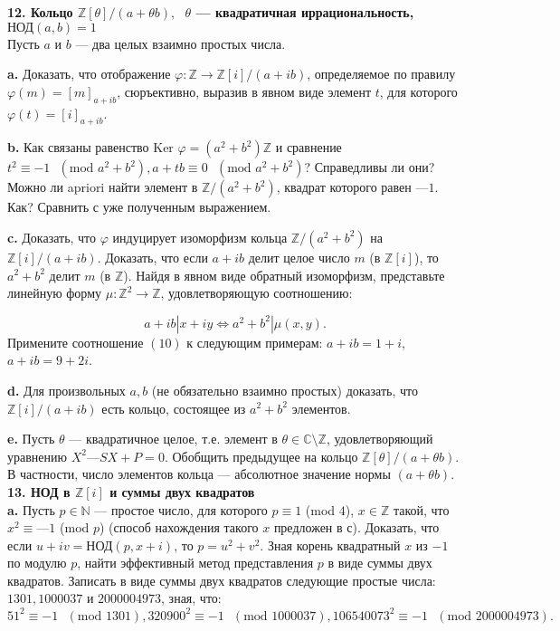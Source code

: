 \noindent \textbf{12. Кольцо $\mathbb{Z}[\theta] / (a + \theta b), \text{ } \theta$ — квадратичная иррациональность,} \\ $\text{НОД}(a,b) = 1$
\\

Пусть $a$ и $b$ — два целых взаимно простых числа.

\textbf{a.} Доказать, что отображение $\varphi:\mathbb{Z}\to\mathbb{Z}[i]/(a+ib)$, определяемое по правилу $\varphi(m)=[m]_{a+ib}$, сюръективно, выразив в явном виде элемент $t$, для которого $\varphi(t)=[i]_{a+ib}$.

\textbf{b.} Как связаны равенство $\text{Ker }\varphi=(a^2+b^2)\mathbb{Z}$ и сравнение $t^2\equiv-1 \text{ } (\text{mod } a^2+b^2), a+tb\equiv0 \text{ } (\text{mod } a^2+b^2)$? Справедливы ли они? Можно ли
apriori найти элемент в $\mathbb{Z}/(a^2 + b^2)$, квадрат которого равен $—1$. Как? Сравнить с уже полученным выражением.

\textbf{c.} Доказать, что $\varphi$ индуцирует изоморфизм кольца $\mathbb{Z}/(a^2 + b^2)$ на $\mathbb{Z}[i]/(a+ib)$. Доказать, что если $a + ib$ делит целое число $m$ (в $\mathbb{Z}[i]$), то $a^2 + b^2$ делит $m$ (в $\mathbb{Z}$). Найдя в явном виде обратный изоморфизм, представьте линейную форму $\mu:\mathbb{Z}^2\to\mathbb{Z}$, удовлетворяющую соотношению:

\[
a+ib|x+iy\Longleftrightarrow a^2+b^2|\mu(x,y).
\]
Примените соотношение $(10)$ к следующим примерам: $a + ib = 1 + i$,
$a + ib = 9 + 2i$.

\pagebreak

\textbf{d.} Для произвольных $a, b$ (не обязательно взаимно простых) 
доказать, что $\mathbb{Z}[i]/(a+ib)$ есть кольцо, состоящее из $a^2 + b^2$ элементов.

\textbf{e.} Пусть $\theta$ — квадратичное целое, т.е. элемент в $\theta \in \mathbb{C}\setminus\mathbb{Z}$, удовлетворяющий уравнению $X^2 — SX + P = 0$. Обобщить предыдущее на кольцо $\mathbb{Z}[\theta] / (a + \theta b)$. В частности, число элементов кольца — абсолютное значение нормы $(a + \theta b)$.
\\

\noindent \textbf{13. НОД в $\mathbb{Z}[i]$ и суммы двух квадратов}
\\

\textbf{a.} Пусть $p \in \mathbb{N}$ — простое число, для которого $p \equiv 1$ (mod $4$), $x \in \mathbb{Z}$ такой, что $x^2 \equiv —1$ (mod $p$) (способ нахождения такого $x$ предложен в с). Доказать, что если $u + iv = $НОД$(p, x + i)$, то $p = u^2 + v^2$. Зная корень квадратный $x$ из $-1$ по модулю $p$, найти эффективный метод представления $p$ в виде суммы двух квадратов. Записать в виде суммы двух квадратов следующие простые числа: $1301, 1000037$ и $2 000 004 973$, зная, что:
\[
51^2 \equiv -1 \text{ } (\text{mod } 1301), 320900^2 \equiv -1 \text{ } (\text{mod } 1000037), 106540073^2 \equiv -1 \text{ } (\text{mod } 2000004973).
\]

